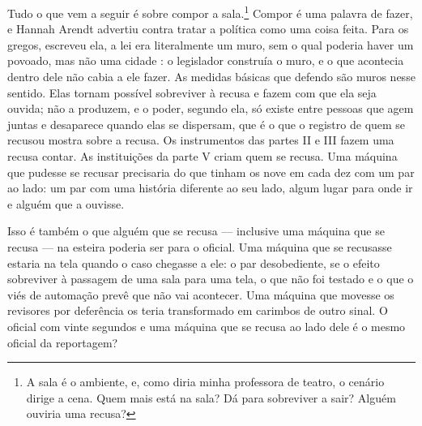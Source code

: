 Tudo o que vem a seguir é sobre compor a sala.\footnote{A sala é o ambiente, e, como diria minha professora de teatro, o cenário dirige a cena. Quem mais está na sala? Dá para sobreviver a sair? Alguém ouviria uma recusa?} Compor é uma palavra de fazer, e Hannah Arendt advertiu contra tratar a política como uma coisa feita. Para os gregos, escreveu ela, a lei era literalmente um muro, sem o qual poderia haver um povoado, mas não uma cidade \autocite{arendt1958human}: o legislador construía o muro, e o que acontecia dentro dele não cabia a ele fazer. As medidas básicas que defendo são muros nesse sentido. Elas tornam possível sobreviver à recusa e fazem com que ela seja ouvida; não a produzem, e o poder, segundo ela, só existe entre pessoas que agem juntas e desaparece quando elas se dispersam, que é o que o registro de quem se recusou mostra sobre a recusa. Os instrumentos das partes II e III fazem uma recusa contar. As instituições da parte V criam quem se recusa. Uma máquina que pudesse se recusar precisaria do que tinham os nove em cada dez com um par ao lado: um par com uma história diferente ao seu lado, algum lugar para onde ir e alguém que a ouvisse.

Isso é também o que alguém que se recusa — inclusive uma máquina que se recusa — na esteira poderia ser para o oficial. Uma máquina que se recusasse estaria na tela quando o caso chegasse a ele: o par desobediente, se o efeito sobreviver à passagem de uma sala para uma tela, o que não foi testado e o que o viés de automação prevê que não vai acontecer. Uma máquina que movesse os revisores por deferência os teria transformado em carimbos de outro sinal. O oficial com vinte segundos e uma máquina que se recusa ao lado dele é o mesmo oficial da reportagem?
